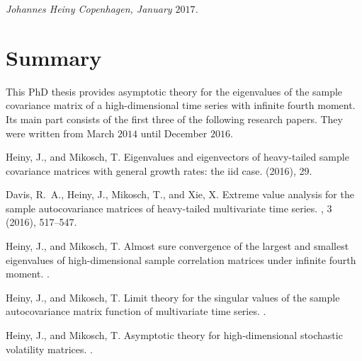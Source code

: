 {\em Johannes Heiny \qquad \qquad \qquad \qquad \qquad Copenhagen, January $2017$.}




\chapter*{Summary}

This PhD thesis provides asymptotic theory for the eigenvalues of the sample covariance matrix of a high-dimensional time series with infinite fourth moment. Its main part consists of the first three of the following research papers. They were written from March $2014$ until December $2016$. 

\begin{enumerate}
{\sc Heiny, J., and Mikosch, T.}
\newblock Eigenvalues and eigenvectors of heavy-tailed sample covariance
  matrices with general growth rates: the iid case.
 (2016), 29. \href{http://www.sciencedirect.com/science/article/pii/S0304414916301934}{\blue{[pdf]}}

{\sc Davis, R.~A., Heiny, J., Mikosch, T., and Xie, X.}
\newblock Extreme value analysis for the sample autocovariance matrices of
  heavy-tailed multivariate time series.
, 3 (2016), 517--547. \href{http://link.springer.com/article/10.1007/s10687-016-0251-7}{\blue{[pdf]}}

{\sc Heiny, J., and Mikosch, T.}
\newblock Almost sure convergence of the largest and smallest eigenvalues of high-dimensional sample correlation matrices under infinite fourth moment.
.

{\sc Heiny, J., and Mikosch, T.}
\newblock Limit theory for the singular values of the sample autocovariance
  matrix function of multivariate time series.
.

{\sc Heiny, J., and Mikosch, T.}
\newblock Asymptotic theory for high-dimensional stochastic volatility matrices.
.
\end{enumerate}

